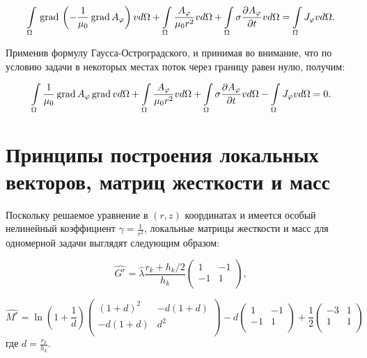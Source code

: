 \begin{equation} \label{eq3}
	\int \limits_{\Omega} \, \mathrm{grad} \, \left( -\frac{1}{\mu_0} \, \mathrm{grad} \,{A_{\varphi}}\right) v d \Omega + \int \limits_{\Omega} \frac{A_{\varphi}}{\mu_0 r^2} v d \Omega + \int \limits_{\Omega} \sigma \frac{\partial A_{\varphi}}{\partial t} v d \Omega = \int \limits_{\Omega} J_{\varphi} v d \Omega.
\end{equation}

Применив формулу Гаусса-Остроградского, и принимая во внимание, что по условию задачи в некоторых местах поток через границу равен нулю, получим:

\begin{equation} \label{eq4}
	\int \limits_{\Omega} \frac{1}{\mu_0}   \, \mathrm{grad} \,{A_{\varphi}} \, \mathrm{grad} \, v d \Omega + \int \limits_{\Omega} \frac{A_{\varphi}}{\mu_0 r^2} v d \Omega + \int \limits_{\Omega} \sigma \frac{\partial A_{\varphi}}{\partial t} v d \Omega - \int \limits_{\Omega} J_{\varphi} v d \Omega = 0.
\end{equation}

\section{Принципы построения локальных векторов, матриц жесткости и масс}
Поскольку решаемое уравнение в $(r, z)$ координатах и имеется особый нелинейный коэффициент $\gamma = \frac{1}{r^2}$, локальные матрицы жесткости и масс для одномерной задачи выглядят следующим образом:

\begin{equation*}
	\hat{G^r} = \hat{\lambda} \frac{r_k + h_k / 2}{h_k} \left(
	\begin{array}{rr}
		 1 & -1\\
		-1 &  1\\
	\end{array}
	\right),
\end{equation*}

\begin{equation*}
    \hat{M^r} = \ln\left(1 + \frac{1}{d}\right)
	\left(
	\begin{array}{cc}
		(1+d)^2 & -d(1+d)\\
		-d(1+d) &  d^2\\
	\end{array}
	\right)
	-d
	\left(
	\begin{array}{rr}
		1 & -1\\
		-1 & 1\\
	\end{array}
	\right)
	+ \frac{1}{2}
	\left(
	\begin{array}{rr}
		-3 & 1\\
		1 & 1\\
	\end{array}
	\right)
\end{equation*}
где $d = \frac{r_k}{h_k}$.


